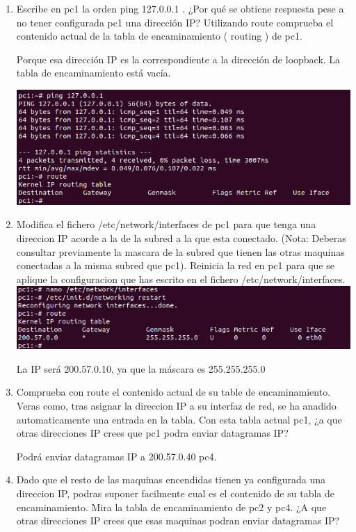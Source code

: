 \documentclass[12pt, a4paper]{report}
\begin{document}
\begin{enumerate}
	\item Escribe en pc1 la orden
	ping 127.0.0.1 . ¿Por qué se obtiene respuesta pese a no tener configurada pc1 una dirección IP? Utilizando
	route comprueba el contenido actual de la tabla de  encaminamiento ( routing ) de 	pc1.
	
	Porque esa dirección IP es la correspondiente a la dirección de loopback. La tabla de encaminamiento está vacía.
	
	\includegraphics*[width=128mm, scale=0.5, center]{ejercicio1}
	\item Modifica el fichero /etc/network/interfaces de pc1
	para que tenga una direccion IP acorde a la de la
	subred a la que esta conectado. (Nota: Deberas consultar previamente la mascara de la subred que tienen
	las otras maquinas conectadas a la misma subred que pc1). Reinicia la red en pc1 para que se aplique la
	configuracion que has escrito en el fichero /etc/network/interfaces.
	\includegraphics*[width=128mm, scale=0.5, center]{ejercicio2}
	
	La IP será 200.57.0.10, ya que la máscara es 255.255.255.0
	\item Comprueba con route el contenido actual de su table de encaminamiento. Veras como, tras asignar la
	direccion IP a su interfaz de red, se ha anadido automaticamente una entrada en la tabla. Con esta tabla
	actual pc1, ¿a que otras direcciones IP crees que pc1 podra enviar datagramas IP?
	
	Podrá enviar datagramas IP a 200.57.0.40 pc4.
	
	\item Dado que el resto de las maquinas encendidas tienen ya configurada una direccion IP, podras suponer facilmente cual es el contenido de su tabla de encaminamiento. Mira la tabla de encaminamiento de pc2 y pc4. ¿A que otras direcciones IP crees que esas maquinas podran enviar datagramas IP?
	

\end{enumerate}
\end{document}
